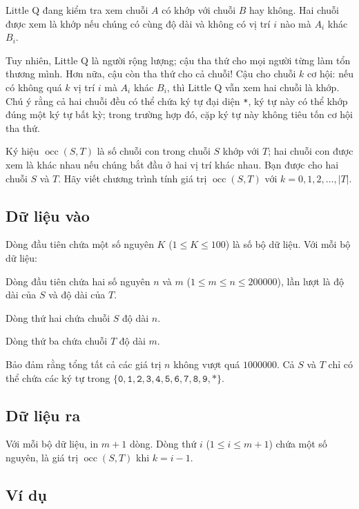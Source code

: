 \documentclass[11pt]{article}
\begin{document}
Little Q đang kiểm tra xem chuỗi \(A\) có khớp với chuỗi \(B\) hay không.
Hai chuỗi được xem là khớp nếu chúng có cùng độ dài và không có vị trí \(i\)
nào mà \(A_i\) khác \(B_i\).

Tuy nhiên, Little Q là người rộng lượng; cậu tha thứ cho mọi người từng làm
tổn thương mình. Hơn nữa, cậu còn tha thứ cho cả chuỗi! Cậu cho chuỗi \(k\)
cơ hội: nếu có không quá \(k\) vị trí \(i\) mà \(A_i\) khác \(B_i\), thì
Little Q vẫn xem hai chuỗi là khớp. Chú ý rằng cả hai chuỗi đều có thể chứa
ký tự đại diện \texttt{*}, ký tự này có thể khớp đúng một ký tự bất kỳ; trong
trường hợp đó, cặp ký tự này không tiêu tốn cơ hội tha thứ.

Ký hiệu \(\operatorname{occ}(S,T)\) là số chuỗi con trong chuỗi \(S\) khớp
với \(T\); hai chuỗi con được xem là khác nhau nếu chúng bắt đầu ở hai vị trí
khác nhau. Bạn được cho hai chuỗi \(S\) và \(T\). Hãy viết chương trình tính
giá trị \(\operatorname{occ}(S,T)\) với
\(k=0,1,2,\ldots,|T|\).

\subsection*{Dữ liệu vào}

Dòng đầu tiên chứa một số nguyên \(K\) (\(1\le K\le 100\)) là số bộ dữ liệu.
Với mỗi bộ dữ liệu:

Dòng đầu tiên chứa hai số nguyên \(n\) và \(m\)
(\(1\le m\le n\le 200000\)), lần lượt là độ dài của \(S\) và độ dài của \(T\).

Dòng thứ hai chứa chuỗi \(S\) độ dài \(n\).

Dòng thứ ba chứa chuỗi \(T\) độ dài \(m\).

Bảo đảm rằng tổng tất cả các giá trị \(n\) không vượt quá \(1000000\). Cả
\(S\) và \(T\) chỉ có thể chứa các ký tự trong
\(\{\texttt{0},\texttt{1},\texttt{2},\texttt{3},\texttt{4},\texttt{5},
\texttt{6},\texttt{7},\texttt{8},\texttt{9},\texttt{*}\}\).

\subsection*{Dữ liệu ra}

Với mỗi bộ dữ liệu, in \(m+1\) dòng. Dòng thứ \(i\)
(\(1\le i\le m+1\)) chứa một số nguyên, là giá trị
\(\operatorname{occ}(S,T)\) khi \(k=i-1\).

\subsection*{Ví dụ}
\end{document}
